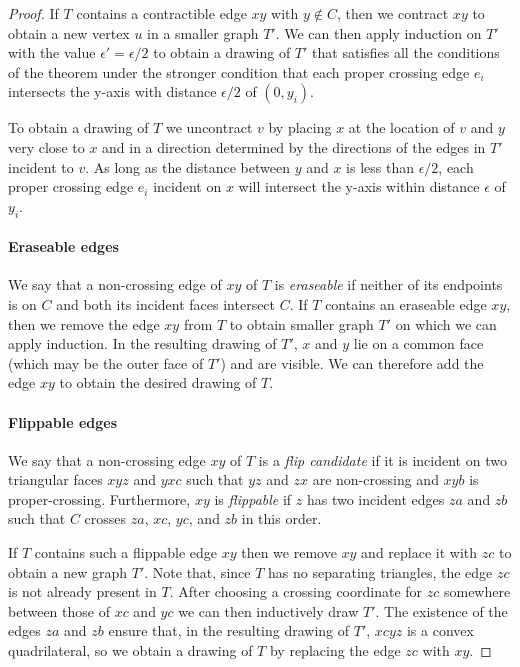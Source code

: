 \documentclass{patmorin}
\begin{document}
\begin{proof}
   If $T$ contains a contractible edge $xy$ with $y\not\in C$,
   then we contract $xy$ to obtain a new vertex $u$ in a smaller
   graph $T'$.   We can then apply induction on $T'$ with the
   value $\epsilon'=\epsilon/2$ to obtain a drawing of $T'$ that satisfies
   all the conditions of the theorem under the stronger condition that
   each proper crossing edge $e_i$ intersects the y-axis with distance
   $\epsilon/2$ of $(0,y_i)$.

   To obtain a drawing of $T$ we uncontract $v$ by placing $x$ at
   the location of $v$ and $y$ very close to $x$ and in a direction
   determined by the directions of the edges in $T'$ incident to $v$.
   As long as the distance between $y$ and $x$ is less than $\epsilon/2$,
   each proper crossing edge $e_i$ incident on $x$ will intersect the
   y-axis within distance $\epsilon$ of $y_i$.

   \paragraph{Eraseable edges}
   We say that a non-crossing edge of $xy$ of $T$ is \emph{eraseable}
   if neither of its endpoints is on $C$ and both its incident faces
   intersect $C$.  If $T$ contains an eraseable edge $xy$, then we remove
   the edge $xy$ from $T$ to obtain smaller graph $T'$ on which we can
   apply induction. In the resulting drawing of $T'$, $x$ and $y$ lie on
   a common face (which may be the outer face of $T'$) and are visible.
   We can therefore add the edge $xy$ to obtain the desired drawing
   of $T$.

   \paragraph{Flippable edges}
   We say that a non-crossing edge $xy$ of $T$ is a \emph{flip candidate}
   if it is incident on two triangular faces $xyz$ and $yxc$ such
   that $yz$ and $zx$ are non-crossing and $xyb$ is proper-crossing.
   Furthermore, $xy$ is \emph{flippable} if $z$ has two incident edges
   $za$ and $zb$ such that $C$ crosses $za$, $xc$, $yc$, and $zb$ in
   this order.  

   If $T$ contains such a flippable edge $xy$ then we remove $xy$ and
   replace it with $zc$ to obtain a new graph $T'$.
   Note that, since $T$ has no separating triangles, the edge $zc$
   is not already present in $T$.
   After choosing a crossing coordinate for $zc$ somewhere
   between those of $xc$ and $yc$ we can then inductively draw $T'$.  
   The existence of the edges $za$
   and $zb$ ensure that, in the resulting drawing of $T'$, $xcyz$ is a
   convex quadrilateral, so we obtain a drawing of $T$ by replacing the
   edge $zc$ with $xy$.


\end{proof}
\end{document}
